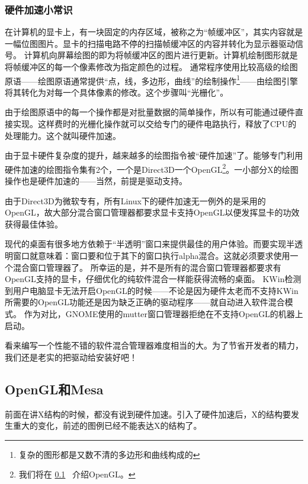 \documentclass[amstex,twoside]{ctexbook}
\newenvironment{insertnote}{ \ttfamily\CJKfamily{KaiTi} }{\vskip 0.5cm }
\newcommand{\secref}[1]{ { \it节\ref{#1}~\nameref{#1}} }
\begin{document}
\begin{insertnote}
\subsubsection{硬件加速小常识}
在计算机的显卡上，有一块固定的内存区域，被称之为“帧缓冲区”，其实内容就是一幅位图图片。显卡的扫描电路不停的扫描帧缓冲区的内容并转化为显示器驱动信号。
计算机向屏幕绘图的即为将帧缓冲区的图片进行更新。计算机绘制图形就是将帧缓冲区的每一个像素修改为指定颜色的过程。
通常程序使用比较高级的绘图原语——绘图原语通常提供“点，线，多边形，曲线”的绘制操作\footnote{复杂的图形都是又数不清的多边形和曲线构成的}——由绘图引擎将其转化为对每一个具体像素的修改。这个步骤叫“光栅化”。

由于绘图原语中的每一个操作都是对批量数据的简单操作，所以有可能通过硬件直接实现。这样费时的光栅化操作就可以交给专门的硬件电路执行，释放了CPU的处理能力。这个就叫硬件加速。

由于显卡硬件复杂度的提升，越来越多的绘图指令被“硬件加速”了。能够专门利用硬件加速的绘图指令集有2个，一个是Direct3D一个OpenGL\footnote{我们将在 \secref{sec:OpenGL} 介绍OpenGL。}。一小部分X的绘图操作也是硬件加速的——当然，前提是驱动支持。

由于Direct3D为微软专有，所有Linux下的硬件加速无一例外的是采用的OpenGL，故大部分混合窗口管理器都要求显卡支持OpenGL以便发挥显卡的功效获得最佳体验。

\end{insertnote}

现代的桌面有很多地方依赖于“半透明”窗口来提供最佳的用户体验。而要实现半透明窗口就意味着：窗口要和位于其下的窗口执行alpha混合。这就必须要求使用一个混合窗口管理器了。
所幸运的是，并不是所有的混合窗口管理器都要求有OpenGL支持的显卡，仔细优化的纯软件混合一样能获得流畅的桌面。
KWin检测到用户电脑显卡无法开启OpenGL的时候——不论是因为硬件太老而不支持KWin所需要的OpenGL功能还是因为缺乏正确的驱动程序——就自动进入软件混合模式。
作为对比，GNOME使用的mutter窗口管理器拒绝在不支持OpenGL的机器上启动。

看来编写一个性能不错的软件混合管理器难度相当的大。为了节省开发者的精力，我们还是老实的把驱动给安装好吧！

\subsection{OpenGL和Mesa}\label{sec:OpenGL}

前面在讲X结构的时候，都没有说到硬件加速。引入了硬件加速后，X的结构要发生重大的变化，前述的图例已经不能表达X的结构了。
\end{document}
